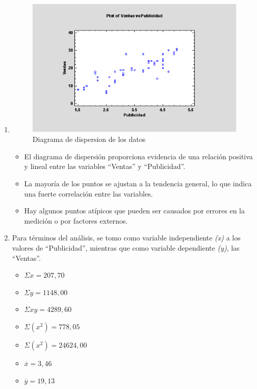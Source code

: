 \documentclass[conference]{IEEEtran}
\begin{document}
\begin{enumerate}
	\item \hfill{}
	      \begin{figure}[H]
		      \begin{center}
			      \includegraphics[width=\linewidth]{./Images/DiagramaDispersion.png}
		      \end{center}
			  \caption{Diagrama de dispersion de los datos}
	      \end{figure}

	      \begin{itemize}
		      \item El diagrama de dispersión proporciona evidencia de una relación
		            positiva y lineal entre las variables ``Ventas'' y ``Publicidad''.

		      \item La mayoría de los puntos se ajustan a la tendencia general, lo que
		            indica una fuerte correlación entre las variables.

		      \item Hay algunos puntos atípicos que pueden ser causados por errores en
		            la medición o por factores externos.
	      \end{itemize}

	\item Para términos del análisis, se tomo como variable
	      independiente \textit{(x)} a los valores de ``Publicidad'', mientras
	      que como variable dependiente \textit{(y)}, las ``Ventas''.

	      \begin{itemize}
		      \item $\Sigma x = 207,70$
		      \item $\Sigma y = 1148,00$
		      \item $\Sigma xy = 4289,60$
		      \item $\Sigma (x^{2}) = 778,05$
		      \item $\Sigma (x^{2}) = 24624,00$
		      \item $\overline{x} = 3,46$
		      \item $\overline{y} = 19,13$
	      \end{itemize}


\end{enumerate}
\end{document}

